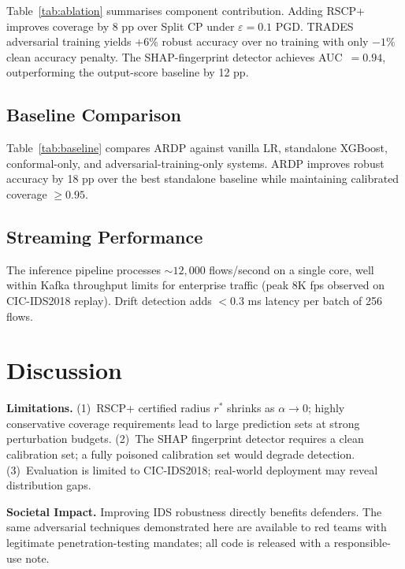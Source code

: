 \documentclass[conference]{IEEEtran}
\begin{document}
Table~\ref{tab:ablation} summarises component contribution. Adding RSCP+
improves coverage by 8 pp over Split CP under $\varepsilon=0.1$ PGD.
TRADES adversarial training yields +6\% robust accuracy over no training
with only $-1\%$ clean accuracy penalty. The SHAP-fingerprint detector
achieves AUC~$=0.94$, outperforming the output-score baseline by 12 pp.



\subsection{Baseline Comparison}

Table~\ref{tab:baseline} compares ARDP against vanilla LR, standalone XGBoost,
conformal-only, and adversarial-training-only systems.
ARDP improves robust accuracy by 18 pp over the best standalone baseline while
maintaining calibrated coverage ${\ge}0.95$.



\subsection{Streaming Performance}

The inference pipeline processes ${\sim}12{,}000$ flows/second on a single
core, well within Kafka throughput limits for enterprise traffic (peak 8K fps
observed on CIC-IDS2018 replay). Drift detection adds $<0.3$ ms latency per
batch of 256 flows.

\section{Discussion}
\label{sec:discussion}

\textbf{Limitations.}
(1)~RSCP+ certified radius $r^*$ shrinks as $\alpha \to 0$; highly conservative
coverage requirements lead to large prediction sets at strong perturbation budgets.
(2)~The SHAP fingerprint detector requires a clean calibration set; a fully
poisoned calibration set would degrade detection.
(3)~Evaluation is limited to CIC-IDS2018; real-world deployment may reveal
distribution gaps.

\textbf{Societal Impact.}
Improving IDS robustness directly benefits defenders. The same adversarial
techniques demonstrated here are available to red teams with legitimate
penetration-testing mandates; all code is released with a responsible-use note.
\end{document}
